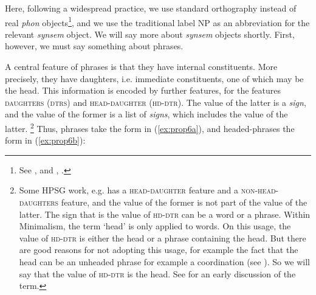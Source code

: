 \documentclass[output=paper
	        ,collection
	        ,collectionchapter
 	        ,biblatex
                ,babelshorthands
                ,newtxmath
                ,draftmode
                ,colorlinks, citecolor=brown
]{langscibook}
\begin{document}
\ea\label{ex:prop5}
\z


Here, following a widespread practice, we use standard orthography instead of real \emph{phon}
objects\footnote{%
See \citet{BK94a-u}, \citet{Hoehle99a-u} and , .},
and we use the traditional label NP as an abbreviation for the relevant \emph{synsem} object. We will say more about \emph{synsem} objects shortly. First, however, we must say something about phrases.

A central feature of phrases is that they have internal constituents. More precisely, they have daughters, i.e. immediate constituents, one of which may be the head. This information is encoded by further features, for \citet[29]{GSag2000a-u} the features \textsc{daughters} (\textsc{dtrs}) and \textsc{head-daughter} (\textsc{hd-dtr}). The value of the latter is a \emph{sign}, and the value of the former is a list of \emph{signs}, which includes the value of the latter.%
%
\footnote{Some HPSG work, e.g. \citet{Sag97a} has a \textsc{head-daughter} feature and a \textsc{non-head-daughters} feature, and the value of the former is not part of the value of the latter. The sign that is the value of \textsc{hd-dtr} can be a word or a phrase. Within Minimalism, the term ‘head’ is only applied to words. On this usage, the value of \textsc{hd-dtr} is either the head or a phrase containing the head. But there are good reasons for not adopting this usage, for example the fact that the head can be an unheaded phrase for example a coordination (see ). So we will say that the value of \textsc{hd-dtr} is the head. See \citet[30]{Jackendoff77a} for an early discussion of the term.}
%
Thus, phrases take the form in (\ref{ex:prop6a}), and headed-phrases the form in (\ref{ex:prop6b}):

\begin{multicols}{2}
\ea\label{ex:prop6}
	\ea\label{ex:prop6a}

\columnbreak
	
	\ex\label{ex:prop6b}
	\z
\z
\end{multicols}
\end{document}
